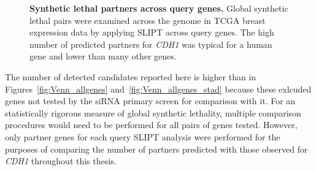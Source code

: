 \begin{figure}[!ht]
\begin{mdframed}
  \begin{center}
   \end{center}
   \caption[Synthetic lethal partners across query genes]{\small \textbf{Synthetic lethal partners across query genes.} Global synthetic lethal pairs were examined across the genome in TCGA breast expression data by applying SLIPT across query genes. The high number of predicted partners for \textit{CDH1} was typical for a human gene and lower than many other genes.
   }
\label{fig:global_SL}
\end{mdframed}
\end{figure}

The number of detected candidates reported here is higher than in Figures~\ref{fig:Venn_allgenes} and~\ref{fig:Venn_allgenes_stad} because these exlcuded genes not tested by the siRNA primary screen \citep{Telford2015} for comparison with it. For an statistically rigorous measure of global synthetic lethality, multiple comparison procedures would need to be performed for all pairs of genes tested. However, only partner genes for each query SLIPT analysis were performed for the purposes of comparing the number of partners predicted with those observed for \textit{CDH1} throughout this thesis.


